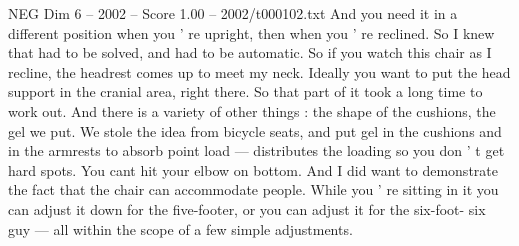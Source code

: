\begin{textsample}{NEG Dim 6 – 2002 – Score 1.00 – 2002/t000102.txt}
And you need it in a different position when you ' re upright, then when you ' re reclined.
So I knew that had to be solved, and had to be automatic.
So if you watch this chair as I recline, the headrest comes up to meet my neck.
Ideally you want to put the head support in the cranial area, right there.
So that part of it took a long time to work out.
And there is a variety of other things : the shape of the cushions, the gel we put.
We stole the idea from bicycle seats, and put gel in the cushions and in the armrests to absorb point load — distributes the loading so you don ' t get hard spots.
You cant hit your elbow on bottom.
And I did want to demonstrate the fact that the chair can accommodate people.
While you ' re sitting in it you can adjust it down for the five-footer, or you can adjust it for the six-foot- six guy — all within the scope of a few simple adjustments.

\end{textsample}
